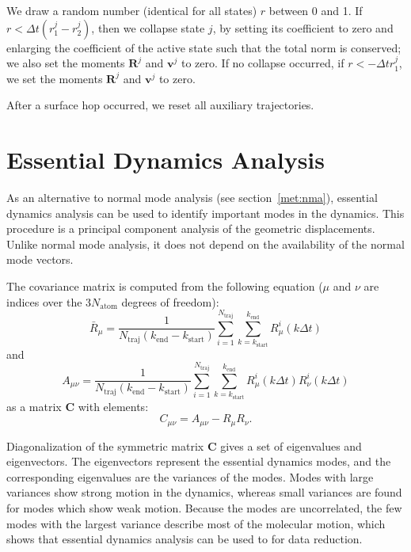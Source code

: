 \documentclass[a4paper,10pt,DIV=15,openany,twoside=false]{scrbook}
\newcommand{\VEC}[1]{\ensuremath{\mathbf{#1}}}
\begin{document}
We draw a random number (identical for all states) $r$ between 0 and 1.
If $r<\Delta t(r^j_1-r^j_2)$, then we collapse state $j$, by setting its coefficient to zero and enlarging the coefficient of the active state such that the total norm is conserved; we also set the moments $\VEC{R}^j$ and $\VEC{v}^j$ to zero.
If no collapse occurred, if $r<-\Delta t r^j_1$, we set the moments $\VEC{R}^j$ and $\VEC{v}^j$ to zero.

After a surface hop occurred, we reset all auxiliary trajectories.







\section{Essential Dynamics Analysis}\label{met:essdyn}

As an alternative to normal mode analysis (see section~\ref{met:nma}), essential dynamics analysis can be used to identify important modes in the dynamics.
This procedure is a principal component analysis of the geometric displacements.\cite{Amadei1993PSFB,Plasser2009}
Unlike normal mode analysis, it does not depend on the availability of the normal mode vectors.

The covariance matrix is computed from the following equation ($\mu$ and $\nu$ are indices over the $3N_\text{atom}$ degrees of freedom):
\begin{equation}
  \bar{R}_\mu=
  \frac{1}{N_\text{traj}(k_\text{end}-k_\text{start})}
  \sum_{i=1}^{N_\text{traj}}
  \sum_{k=k_\text{start}}^{k_\text{end}} 
  R_\mu^i(k\Delta t)
\end{equation}
and
\begin{equation}
  A_{\mu\nu}=
  \frac{1}{N_\text{traj}(k_\text{end}-k_\text{start})}
  \sum_{i=1}^{N_\text{traj}}
  \sum_{k=k_\text{start}}^{k_\text{end}} 
  R_\mu^i(k\Delta t)
  R_\nu^i(k\Delta t)
\end{equation}
as a matrix $\VEC{C}$ with elements:
\begin{equation}
  C_{\mu\nu}=
  A_{\mu\nu}-R_\mu R_\nu.
\end{equation}

Diagonalization of the symmetric matrix $\VEC{C}$ gives a set of eigenvalues and eigenvectors.
The eigenvectors represent the essential dynamics modes, and the corresponding eigenvalues are the variances of the modes.
Modes with large variances show strong motion in the dynamics, whereas small variances are found for modes which show weak motion.
Because the modes are uncorrelated, the few modes with the largest variance describe most of the molecular motion, which shows that essential dynamics analysis can be used to for data reduction.
\end{document}
